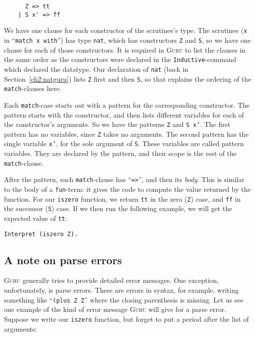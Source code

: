 \documentclass{book}[12pt]
\newcommand{\guru}[0]{\textsc{Guru}\xspace}
\begin{document}
\begin{verbatim}
      Z => tt 
    | S x' => ff
\end{verbatim}

\noindent We have one clause for each constructor of the scrutinee's
type.  The scrutinee (\texttt{x} in ``\texttt{match x with}'') has
type \texttt{nat}, which has constructors \texttt{Z} and \texttt{S},
so we have one clause for each of those constructors.  It is required
in \guru to list the clauses in the same order as the constructors
were declared in the \texttt{Inductive}-command which declared the
datatype.  Our declaration of \texttt{nat} (back in
Section~\ref{ch2:natguru}) lists \texttt{Z} first and then \texttt{S},
so that explains the ordering of the \texttt{match}-clauses here.

Each \texttt{match}-case starts out with a pattern for the
corresponding constructor.  The pattern starts with the constructor,
and then lists different variables for each of the constructor's
arguments.  So we have the patterns \texttt{Z} and \texttt{S x'}.  The
first pattern has no variables, since \texttt{Z} takes no arguments.
The second pattern has the single variable \texttt{x'}, for the sole
argument of \texttt{S}.  These variables are called pattern variables.
They are declared by the pattern, and their scope is the rest of the
\texttt{match}-clause.

After the pattern, each \texttt{match}-clause has ``\texttt{=>}'', and
then its \emph{body}.  This is similar to the body of a
\texttt{fun}-term: it gives the code to compute the value returned by
the function.  For our \texttt{iszero} function, we return \texttt{tt}
in the zero (\texttt{Z}) case, and \texttt{ff} in the successor
(\texttt{S}) case.  If we then run the following example, we will get
the expected value of \texttt{tt}:

\begin{verbatim}
Interpret (iszero Z).
\end{verbatim}

\subsection{A note on parse errors}
\label{ch2:err}

\guru generally tries to provide detailed error messages.  One
exception, unfortunately, is parse errors.  These are errors in
syntax, for example, writing something like ``\texttt{(plus Z Z}''
where the closing parenthesis is missing.  Let us see one example
of the kind of error message \guru will give for a parse error.
Suppose we write our \texttt{iszero} function, but forget to put
a period after the list of arguments:
\end{document}
